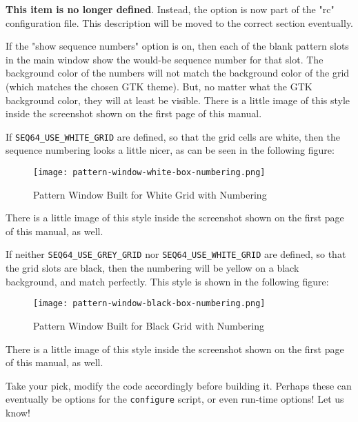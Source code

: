         \textbf{This item is no longer defined}.
        Instead, the option is now part of the "rc" configuration file.  This
        description will be moved to the correct section eventually.

        If the "show sequence numbers" option is on, then each
        of the blank pattern slots in the main window show the would-be
        sequence number for that slot.  The background color of the numbers
        will not match the background color of the grid (which matches the
        chosen GTK theme).  But, no matter what the GTK background color, they
        will at least be visible.  There is a little image of this style inside
        the screenshot shown on the first page of this manual.

        If \texttt{SEQ64\_USE\_WHITE\_GRID}
        are defined, so that the grid cells are white, then the sequence
        numbering looks a little nicer, as can be seen in the following
        figure:

\begin{figure}[H]
   \centering 
   \texttt{[image: pattern-window-white-box-numbering.png]}
   \caption{Pattern Window Built for White Grid with Numbering}
   \label{fig:seq64_build_white_box_numbering}
\end{figure}

        There is a little image of this style inside the screenshot shown on
        the first page of this manual, as well.

        If neither \texttt{SEQ64\_USE\_GREY\_GRID} nor
        \texttt{SEQ64\_USE\_WHITE\_GRID} are defined, so that the grid slots
        are black, then the numbering will be yellow on a black background, and
        match perfectly.  This style is shown in the following figure:

\begin{figure}[H]
   \centering 
   \texttt{[image: pattern-window-black-box-numbering.png]}
   \caption{Pattern Window Built for Black Grid with Numbering}
   \label{fig:seq64_build_black_box_numbering}
\end{figure}

      There is a little image of this style inside the screenshot shown on
      the first page of this manual, as well.

      Take your pick, modify the code accordingly before building it.
      Perhaps these can eventually be options for the \texttt{configure}
      script, or even run-time options!  Let us know!

